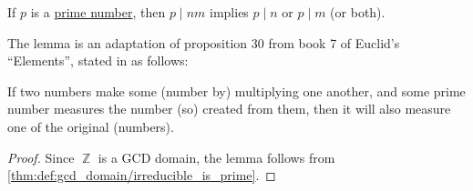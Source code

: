 \begin{lemma}\label{thm:euclids_lemma}
  If \( p \) is a \hyperref[def:prime_number]{prime number}, then \( p \mid nm \) implies \( p \mid n \) or \( p \mid m \) (or both).
\end{lemma}
\begin{comments}
  \item The lemma is an adaptation of proposition 30 from book 7 of Euclid's \enquote{Elements}, stated in \cite[218]{Euclid2008Elements} as follows:
  \begin{displayquote}
    If two numbers make some (number by) multiplying one another, and some prime number measures the number (so) created from them, then it will also measure one of the original (numbers).
  \end{displayquote}
\end{comments}
\begin{proof}
  Since \( \BbbZ \) is a GCD domain, the lemma follows from \cref{thm:def:gcd_domain/irreducible_is_prime}.
\end{proof}

